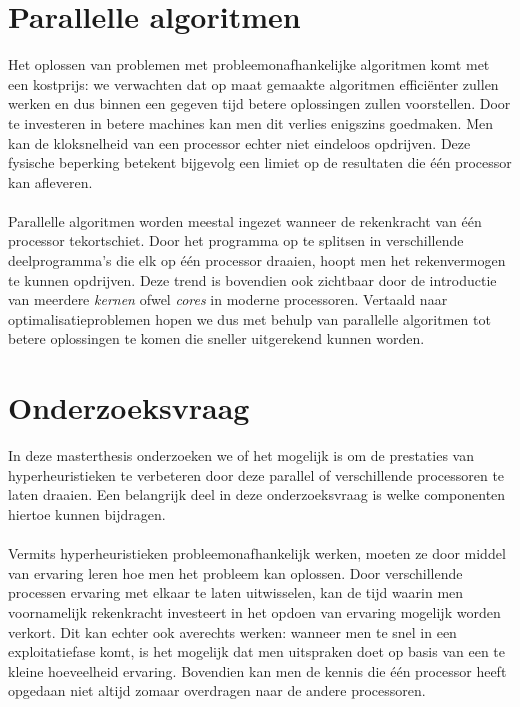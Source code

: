\section{Parallelle algoritmen}

Het oplossen van problemen met probleemonafhankelijke algoritmen komt met een kostprijs: we verwachten dat op maat gemaakte algoritmen effici\"enter zullen werken en dus binnen een gegeven tijd betere oplossingen zullen voorstellen. Door te investeren in betere machines kan men dit verlies enigszins goedmaken. Men kan de kloksnelheid van een processor echter niet eindeloos opdrijven. Deze fysische beperking betekent bijgevolg een limiet op de resultaten die \'e\'en processor kan afleveren.

\paragraph{}
Parallelle algoritmen worden meestal ingezet wanneer de rekenkracht van \'e\'en processor tekortschiet. Door het programma op te splitsen in verschillende deelprogramma's die elk op \'e\'en processor draaien, hoopt men het rekenvermogen te kunnen opdrijven. Deze trend is bovendien ook zichtbaar door de introductie van meerdere \emph{kernen} ofwel \emph{cores} in moderne processoren. Vertaald naar optimalisatieproblemen hopen we dus met behulp van parallelle algoritmen tot betere oplossingen te komen die sneller uitgerekend kunnen worden.

\section{Onderzoeksvraag}

In deze masterthesis onderzoeken we of het mogelijk is om de prestaties van hyperheuristieken te verbeteren door deze parallel of verschillende processoren te laten draaien. Een belangrijk deel in deze onderzoeksvraag is welke componenten hiertoe kunnen bijdragen.

\paragraph{}
Vermits hyperheuristieken probleemonafhankelijk werken, moeten ze door middel van ervaring leren hoe men het probleem kan oplossen. Door verschillende processen ervaring met elkaar te laten uitwisselen, kan de tijd waarin men voornamelijk rekenkracht investeert in het opdoen van ervaring mogelijk worden verkort. Dit kan echter ook averechts werken: wanneer men te snel in een exploitatiefase komt, is het mogelijk dat men uitspraken doet op basis van een te kleine hoeveelheid ervaring. Bovendien kan men de kennis die \'e\'en processor heeft opgedaan niet altijd zomaar overdragen naar de andere processoren.

